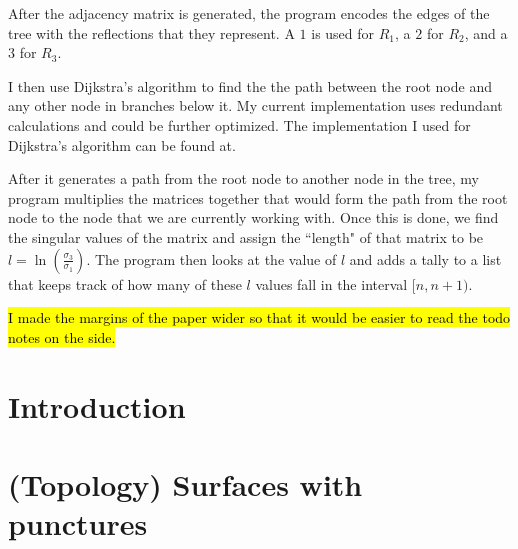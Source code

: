 \documentclass{amsart}
\begin{document}
After the adjacency matrix is generated, the program encodes the edges of the tree with the reflections that they represent. A $1$ is used for $R_1$, a $2$ for $R_2$, and a $3$ for $R_3$. 

I then use Dijkstra's algorithm to find the the path between the root node and any other node in branches below it. My current implementation uses redundant calculations and could be further optimized. The implementation I used for Dijkstra's algorithm can be found at.


 After it generates a path from the root node to another node in the tree, my program multiplies the matrices together that would form the path from the root node to the node that we are currently working with. Once this is done, we find the singular values of the matrix and assign the ``length" of that matrix to be $l = \ln\left(\frac{\sigma_3}{\sigma_1}\right)$. The program then looks at the value of $l$ and adds a tally to a list that keeps track of how many of these $l$ values fall in the interval $[n, n+1)$.
 

\newpage

\hl{I made the margins of the paper wider so that it would be easier to read the todo notes on the side.}
\section{Introduction}
\section{(Topology) Surfaces with punctures}
\end{document}
